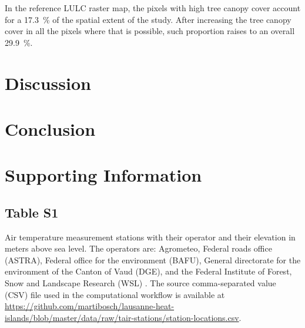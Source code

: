 \documentclass[10pt,letterpaper]{article}
\begin{document}
In the reference LULC raster map, the pixels with high tree canopy cover account for a 17.3~\% of the spatial extent of the study. After increasing the tree canopy cover in all the pixels where that is possible, such proportion raises to an overall 29.9~\%.


\section*{Discussion}



\section*{Conclusion}


\section*{Supporting Information}

\subsection*{Table S1}
\label{table-station-locations}

Air temperature measurement stations with their operator and their elevation in meters above sea level. The operators are: Agrometeo, Federal roads office (ASTRA), Federal office for the environment (BAFU), General directorate for the environment of the Canton of Vaud (DGE), and the Federal Institute of Forest, Snow and Landscape Research (WSL) \cite{rebetez2018meteorological}. The source comma-separated value (CSV) file used in the computational workflow is available at \url{https://github.com/martibosch/lausanne-heat-islands/blob/master/data/raw/tair-stations/station-locations.csv}.
\end{document}
